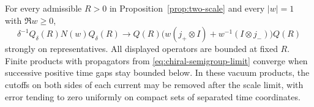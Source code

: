 \begin{lemma}\label{lem:current-limit}
For every admissible $R>0$ in Proposition~\ref{prop:two-scale} and every
$|w|=1$ with $\Re w\ge0$,
\begin{equation}\label{eq:chiral-current-limit}
 \delta^{-1}Q_\delta(R)N(w)Q_\delta(R)
 \longrightarrow
 Q(R)\bigl(w(j_+\otimes I)+w^{-1}(I\otimes j_-)\bigr)Q(R)
\end{equation}
strongly on representatives. All displayed operators are bounded at fixed
$R$. Finite products with propagators from
\eqref{eq:chiral-semigroup-limit} converge when successive positive time
gaps stay bounded below. In these vacuum products, the cutoffs on both
sides of each current may be removed after the scale limit, with error
tending to zero uniformly on compact sets of separated time coordinates.
\end{lemma}

